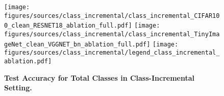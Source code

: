 

\begin{figure}[h]
    \centering
    \texttt{[image: figures/sources/class\_incremental/class\_incremental\_CIFAR100\_clean\_RESNET18\_ablation\_full.pdf]}
    \texttt{[image: figures/sources/class\_incremental/class\_incremental\_TinyImageNet\_clean\_VGGNET\_bn\_ablation\_full.pdf]}
    \texttt{[image: figures/sources/class\_incremental/legend\_class\_incremental\_ablation.pdf]}
    
    \caption{\textbf{Test Accuracy for Total Classes in Class-Incremental Setting.}}
    
    \label{exp_class_incremental_ablation_full}
\end{figure}

